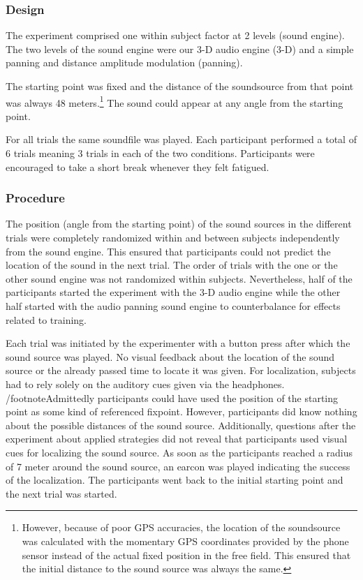 \documentclass[journal]{IEEEtran}
\begin{document}
\subsubsection{Design}
The experiment comprised one within subject factor at 2 levels (sound engine). The two levels of the sound engine were our 3-D audio engine (3-D) and a simple panning and distance amplitude modulation (panning).

The starting point was fixed and the distance of the soundsource from that point was always 48 meters.\footnote{However, because of poor GPS accuracies, the location of the soundsource was calculated with the momentary GPS coordinates provided by the phone sensor instead of the actual fixed position in the free field. This ensured that the initial distance to the sound source was always the same.} The sound could appear at any angle from the starting point.

For all trials the same soundfile was played. Each participant performed a total of 6 trials meaning 3 trials in each of the two conditions. Participants were encouraged to take a short break whenever they felt fatigued.

\subsubsection{Procedure}
The position (angle from the starting point) of the sound sources in the different trials were completely randomized within and between subjects independently from the sound engine. This ensured that participants could not predict the location of the sound in the next trial. The order of trials with the one or the other sound engine was not randomized within subjects. Nevertheless, half of the participants started the experiment with the 3-D audio engine while the other half started with the audio panning sound engine to counterbalance for effects related to training.

Each trial was initiated by the experimenter with a button press after which the sound source was played. No visual feedback about the location of the sound source or the already passed time to locate it was given. For localization, subjects had to rely solely on the auditory cues given via the headphones. /footnote{Admittedly participants could have used the position of the starting point as some kind of referenced fixpoint. However, participants did know nothing about the possible distances of the sound source. Additionally, questions after the experiment about applied strategies did not reveal that participants used visual cues for localizing the sound source.} As soon as the participants reached a radius of 7 meter around the sound source, an earcon was played indicating the success of the localization. The participants went back to the initial starting point and the next trial was started.
\end{document}

